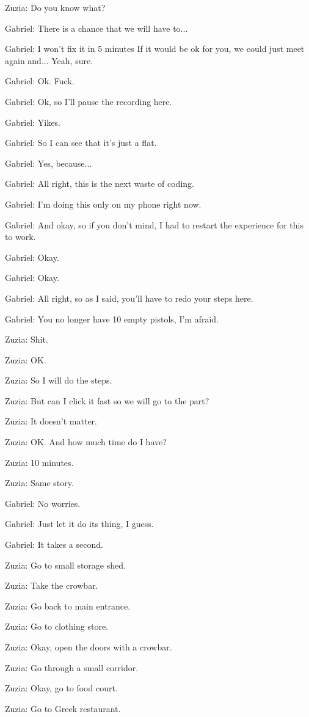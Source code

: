 Zuzia: Do you know what?

Gabriel: There is a chance that we will have to...

Gabriel: I won't fix it in 5 minutes If it would be ok for you, we could just meet again and... Yeah, sure.

Gabriel: Ok. Fuck.

Gabriel: Ok, so I'll pause the recording here.

Gabriel: Yikes.

Gabriel: So I can see that it's just a flat.

Gabriel: Yes, because...

Gabriel: All right, this is the next waste of coding.

Gabriel: I'm doing this only on my phone right now.

Gabriel: And okay, so if you don't mind, I had to restart the experience for this to work.

Gabriel: Okay.

Gabriel: Okay.

Gabriel: All right, so as I said, you'll have to redo your steps here.

Gabriel: You no longer have 10 empty pistols, I'm afraid.

Zuzia: Shit.

Zuzia: OK.

Zuzia: So I will do the steps.

Zuzia: But can I click it fast so we will go to the part?

Zuzia: It doesn't matter.

Zuzia: OK. And how much time do I have?

Zuzia: 10 minutes.

Zuzia: Same story.

Gabriel: No worries.

Gabriel: Just let it do its thing, I guess.

Gabriel: It takes a second.

Zuzia: Go to small storage shed.

Zuzia: Take the crowbar.

Zuzia: Go back to main entrance.

Zuzia: Go to clothing store.

Zuzia: Okay, open the doors with a crowbar.

Zuzia: Go through a small corridor.

Zuzia: Okay, go to food court.

Zuzia: Go to Greek restaurant.

